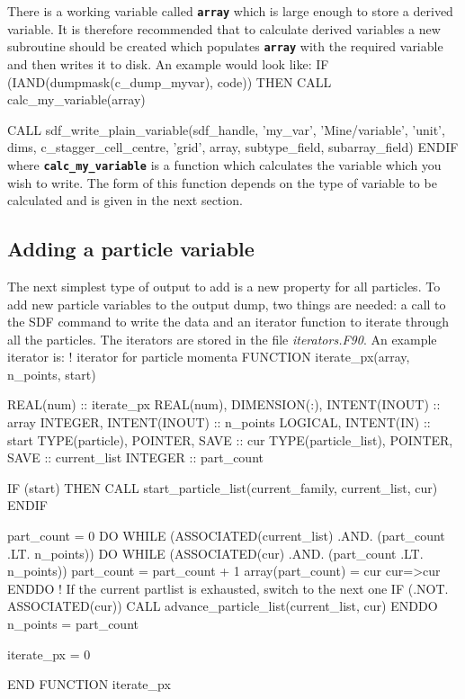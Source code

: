 \documentclass[12pt,a4paper]{article}
\newcommand{\inlinecode}[1]{{\color{warwickred} \bf\texttt{#1}}}
\newenvironment{boxverbatim}{\lboxverbatim{none}}{\endlboxverbatim}
\begin{document}
There is a working variable called \inlinecode{array} which is large enough to
store a derived variable. It is
therefore recommended that to calculate derived variables a new subroutine
should be created which populates \inlinecode{array} with the required variable
and then writes it to disk. An example would look like:
\begin{boxverbatim}
IF (IAND(dumpmask(c_dump_myvar), code)) THEN
  CALL calc_my_variable(array)

  CALL sdf_write_plain_variable(sdf_handle, 'my_var', 'Mine/variable', 'unit',
      dims, c_stagger_cell_centre, 'grid', array, subtype_field, subarray_field)
ENDIF
\end{boxverbatim}
where \inlinecode{calc\_my\_variable} is a function which calculates the
variable which you wish to write. The form of this function depends on the type
of variable to be calculated and is given in the next section.

\subsection{Adding a particle variable}
The next simplest type of output to add is a new property for all particles. To
add new particle variables to the output dump, two things are needed: a call
to the SDF command to write the data and an iterator function to iterate
through all the particles. The iterators are stored in the file
{\it iterators.F90}. An example iterator is:
\begin{boxverbatim}
  ! iterator for particle momenta
  FUNCTION iterate_px(array, n_points, start)

    REAL(num) :: iterate_px
    REAL(num), DIMENSION(:), INTENT(INOUT) :: array
    INTEGER, INTENT(INOUT) :: n_points
    LOGICAL, INTENT(IN) :: start
    TYPE(particle), POINTER, SAVE :: cur
    TYPE(particle_list), POINTER, SAVE :: current_list
    INTEGER :: part_count

    IF (start)  THEN
      CALL start_particle_list(current_family, current_list, cur)
    ENDIF

    part_count = 0
    DO WHILE (ASSOCIATED(current_list) .AND. (part_count .LT. n_points))
      DO WHILE (ASSOCIATED(cur) .AND. (part_count .LT. n_points))
        part_count = part_count + 1
        array(part_count) = cur%
        cur=>cur%
      ENDDO
      ! If the current partlist is exhausted, switch to the next one
      IF (.NOT. ASSOCIATED(cur)) CALL advance_particle_list(current_list, cur)
    ENDDO
    n_points = part_count

    iterate_px = 0

  END FUNCTION iterate_px
\end{boxverbatim}
\end{document}
